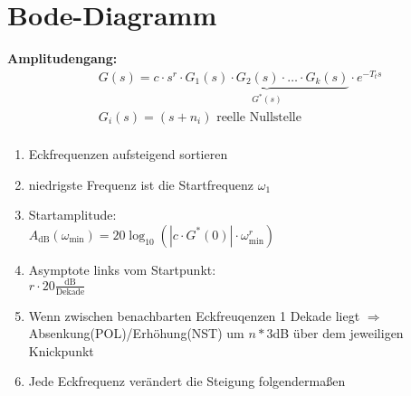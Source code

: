 \setcounter{section}{6}
\section{Bode-Diagramm}
\begin{tcolorbox}[colback=white!10!white,
                  colframe=blue!50!white,
                  title=Konstruktionsregeln Bode-Diagramm]
    \textbf{Amplitudengang:}
    \begin{align*}
        &G(s) = c\cdot s^r\cdot \underbrace{G_1(s) \cdot G_2(s)\cdot \ldots \cdot G_k(s)}_{G^*(s)}\cdot e^{-T_ts}\\
        &G_i(s)  = (s+n_i)  \text{ reelle Nullstelle}\\
    \end{align*}
    \begin{enumerate}
        \item Eckfrequenzen aufsteigend sortieren
        \item niedrigste Frequenz ist die Startfrequenz $\omega_1$
        \item Startamplitude:\\ $A_{\text{dB}}(\omega_{\text{min}}) = 20 \log_{10}(|c\cdot G^{*}(0)|\cdot \omega_{\text{min}}^r)$
        \item Asymptote links vom Startpunkt:\\
        $r\cdot20 \frac{\text{dB}}{\text{Dekade}}$
        \item Wenn zwischen benachbarten Eckfreuqenzen 1 Dekade liegt $\Rightarrow$ Absenkung(POL)/Erhöhung(NST) um  $n*3$dB über dem jeweiligen Knickpunkt
        \item Jede Eckfrequenz verändert die Steigung folgendermaßen
\end{enumerate}
\end{tcolorbox}
